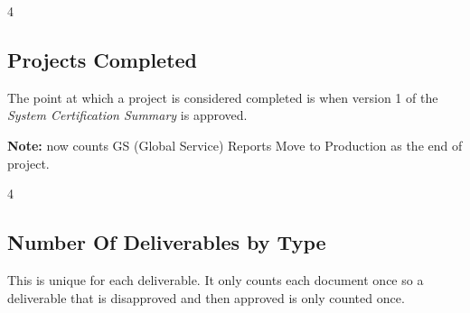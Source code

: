 \documentclass{article}
\begin{document}
\begin{Schunk}
\begin{Soutput}
[1] 4
\end{Soutput}
\end{Schunk}

\subsection{Projects Completed}

The point at which a project is considered completed is when version 1 of the
\textit{System Certification Summary} is approved.

\textbf{Note:} now counts GS (Global Service) Reports Move to Production as the end
of project.

\begin{Schunk}
\begin{Soutput}
[1] 4
\end{Soutput}
\end{Schunk}


\subsection{Number Of Deliverables by Type}
This is unique for each deliverable. It only counts each document once so a deliverable
that is disapproved and then approved is only counted once.
\end{document}
